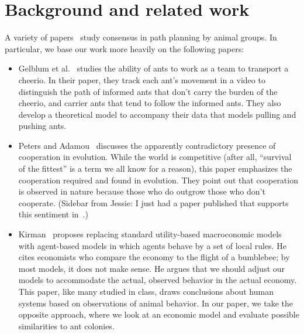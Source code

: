 \documentclass[12pt]{article}
\begin{document}
\section{Background and related work}

A variety of papers~\cite{leonard2012decision, berdahl2013emergent, couzin2011uninformed} study consensus in path planning by animal groups.
In particular, we base our work more heavily on the following papers:

\begin{itemize}
	\item Gelblum et al.~\cite{gelblum2015ant} studies the ability of ants to work as a team to transport a cheerio.
	In their paper, they track each ant's movement in a video to distinguish the path of informed ants that don't carry the burden of the cheerio, and carrier ants that tend to follow the informed ants.
	They also develop a theoretical model to accompany their data that models pulling and pushing ants.
	\item Peters and Adamou~\cite{peters2015evolutionary} discusses the apparently contradictory presence of cooperation in evolution.
	While the world is competitive (after all, ``survival of the fittest'' is a term we all know for a reason), this paper emphasizes the cooperation required and found in evolution.
	They point out that cooperation is observed in nature because those who do outgrow those who don't cooperate.
	(Sidebar from Jessie: I just had a paper published that supports this sentiment in~\cite{finocchiaro2019evolving}.)
	
	\item Kirman~\cite{kirman2016ants} proposes replacing standard utility-based macroconomic models with agent-based models in which agents behave by a set of local rules.
	He cites economists who compare the economy to the flight of a bumblebee; by most models, it does not make sense.
	He argues that we should adjust our models to accommodate the actual, observed behavior in the actual economy.
	This paper, like many studied in class, draws conclusions about human systems based on observations of animal behavior.
	In our paper, we take the opposite approach, where we look at an economic model and evaluate possible similarities to ant colonies.
\end{itemize}
\end{document}
